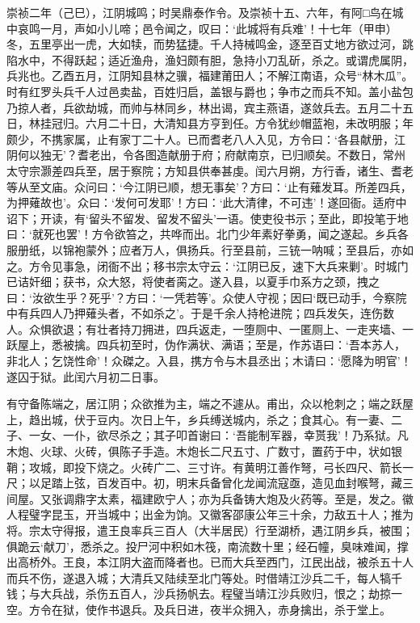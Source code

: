 \documentclass[]{article}
\begin{document}
崇祯二年（己巳），江阴城鸣；时吴鼎泰作令。及崇祯十五、六年，有阿□鸟在城中哀鸣一月，声如小儿啼；邑令闻之，叹曰：`此城将有兵难'！十七年（甲申）冬，五里亭出一虎，大如犊，而势猛捷。千人持械鸣金，逐至百丈地方欲过河，跳陷水中，不得跃起；适近渔舟，渔妇颇有胆，急持小刀乱斫，杀之。或谓虎属阴，兵兆也。乙酉五月，江阴知县林之骥，福建莆田人；不解江南语，众号``林木瓜''。时有红罗头兵千人过邑卖盐，百姓归启，盖银与爵也；争市之而兵不知。盖小盐包乃掠人者，兵欲劫城，而帅与林同乡，林出谒，宾主燕语，遂敛兵去。五月二十五日，林挂冠归。六月二十日，大清知县方亨到任。方令犹纱帽蓝袍，未改明服；年颇少，不携家属，止有家丁二十人。已而耆老八人入见，方令曰：`各县献册，江阴何以独无'？耆老出，令各图造献册于府；府献南京，已归顺矣。不数日，常州太守宗灏差四兵至，居于察院；方知县供奉甚虔。闰六月朔，方行香，诸生、耆老等从至文庙。众问曰：`今江阴已顺，想无事矣'？方曰：`止有薙发耳。所差四兵，为押薙故也'。众曰：`发何可发耶'！方曰：`此大清律，不可违'！遂回衙。适府中诏下；开读，有`留头不留发、留发不留头'一语。使吏役书示；至此，即投笔于地曰：`就死也罢'！方令欲笞之，共哗而出。北门少年素好拳勇，闻之遂起。乡兵各服册纸，以锦袍蒙外；应者万人，俱扬兵。行至县前，三铳一呐喊；至县后，亦如之。方令见事急，闭衙不出；移书宗太守云：`江阴已反，速下大兵来剿'。时城门已诘奸细；获书，众大怒，将使者脔之。遂入县，以夏手巾系方之颈，拽之曰：`汝欲生乎？死乎'？方曰：`一凭若等'。众使人守视；因曰`既已动手，今察院中有兵四人乃押薙头者，不如杀之'。于是千余人持枪进院；四兵发矢，连伤数人。众惧欲退；有壮者持刀拥进，四兵返走，一堕厕中、一匿厕上、一走夹墙、一跃屋上，悉被擒。四兵初至时，伪作满状、满语；至是，作苏语曰：`吾本苏人，非北人；乞饶性命'！众磔之。入县，携方令与木县丞出；木请曰：`愿降为明官'！遂囚于狱。此闰六月初二日事。

有守备陈端之，居江阴；众欲推为主，端之不遽从。甫出，众以枪刺之；端之跃屋上，趋出城，伏于豆内。次日上午，乡兵缚送城内，杀之；食其心。有一妻、二子、一女、一仆，欲尽杀之；其子叩首谢曰：`吾能制军器，幸贳我'！乃系狱。凡木炮、火球、火砖，俱陈子手造。木炮长二尺五寸、广数寸，置药于中，状如银鞘；攻城，即投下烧之。火砖广二、三寸许。有黄明江善作弩，弓长四尺、箭长一尺；以足踏上弦，百发百中。初，明末兵备曾化龙闻流寇亟，造见血封喉弩，藏三间屋。又张调鼎字太素，福建欧宁人；亦为兵备铸大炮及火药等。至是，发之。徽人程璧字昆玉，开当城中；出金为饷。又徽客邵康公年三十余，力敌五十人；推为将。宗太守得报，遣王良率兵三百人（大半居民）行至湖桥，遇江阴乡兵，被围；俱跪云`献刀'，悉杀之。投尸河中积如木筏，南流数十里；经石幢，臭味难闻，撑出高桥外。王良，本江阴大盗而降者也。已而大兵至西门，江民出战，被杀五十人而兵不伤，遂退入城；大清兵又陆续至北门等处。时借靖江沙兵二千，每人犒千钱；与大兵战，杀伤五百人，沙兵扬帆去。程璧当靖江沙兵败归，恨之；劫掠一空。方令在狱，使作书退兵。及兵日进，夜半众拥入，赤身擒出，杀于堂上。
\end{document}
